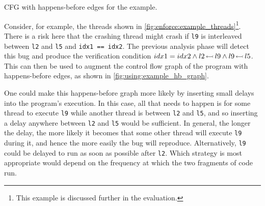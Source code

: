 \begin{sanefig}
  {\hfill}
  {\hfill}
  \caption{CFG with happens-before edges for the example. }
  \label{fig:using:example_hb_graph}
\end{sanefig}

Consider, for example, the threads shown in
\autoref{fig:enforce:example_threads}\footnote{This example is
  discussed further in the evaluation.}.  There is a risk here that the crashing thread might
crash if \verb|l9| is interleaved between \verb|l2| and \verb|l5| and
\verb|idx1 == idx2|.  The previous analysis phase will detect this bug
and produce the verification condition $idx1 = idx2 \wedge
l2\,{\leftarrowtail}\,l9 \wedge l9\,{\leftarrowtail}\,l5$.  This can then
be used to augment the control flow graph of the program with
happens-before edges, as shown in
\autoref{fig:using:example_hb_graph}.

One could make this happens-before graph more likely by inserting
small delays into the program's execution.  In this case, all that
needs to happen is for some thread to execute \texttt{l9} while
another thread is between \texttt{l2} and \texttt{l5}, and so
inserting a delay anywhere between \texttt{l2} and \texttt{l5} would
be sufficient.  In general, the longer the delay, the more likely it
becomes that some other thread will execute \texttt{l9} during it, and
hence the more easily the bug will reproduce.  Alternatively,
\texttt{l9} could be delayed to run as soon as possible after
\texttt{l2}.  Which strategy is most appropriate would depend on the
frequency at which the two fragments of code run.

